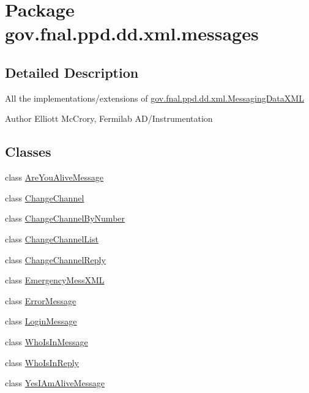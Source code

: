 \hypertarget{namespacegov_1_1fnal_1_1ppd_1_1dd_1_1xml_1_1messages}{\section{Package gov.\-fnal.\-ppd.\-dd.\-xml.\-messages}
\label{namespacegov_1_1fnal_1_1ppd_1_1dd_1_1xml_1_1messages}
}


\subsection{Detailed Description}
All the implementations/extensions of \hyperlink{classgov_1_1fnal_1_1ppd_1_1dd_1_1xml_1_1MessagingDataXML}{gov.\-fnal.\-ppd.\-dd.\-xml.\-Messaging\-Data\-X\-M\-L}

\begin{DoxyAuthor}{Author}
Elliott Mc\-Crory, Fermilab A\-D/\-Instrumentation 
\end{DoxyAuthor}
\subsection*{Classes}
\begin{DoxyCompactItemize}
\item 
class \hyperlink{classgov_1_1fnal_1_1ppd_1_1dd_1_1xml_1_1messages_1_1AreYouAliveMessage}{Are\-You\-Alive\-Message}
\item 
class \hyperlink{classgov_1_1fnal_1_1ppd_1_1dd_1_1xml_1_1messages_1_1ChangeChannel}{Change\-Channel}
\item 
class \hyperlink{classgov_1_1fnal_1_1ppd_1_1dd_1_1xml_1_1messages_1_1ChangeChannelByNumber}{Change\-Channel\-By\-Number}
\item 
class \hyperlink{classgov_1_1fnal_1_1ppd_1_1dd_1_1xml_1_1messages_1_1ChangeChannelList}{Change\-Channel\-List}
\item 
class \hyperlink{classgov_1_1fnal_1_1ppd_1_1dd_1_1xml_1_1messages_1_1ChangeChannelReply}{Change\-Channel\-Reply}
\item 
class \hyperlink{classgov_1_1fnal_1_1ppd_1_1dd_1_1xml_1_1messages_1_1EmergencyMessXML}{Emergency\-Mess\-X\-M\-L}
\item 
class \hyperlink{classgov_1_1fnal_1_1ppd_1_1dd_1_1xml_1_1messages_1_1ErrorMessage}{Error\-Message}
\item 
class \hyperlink{classgov_1_1fnal_1_1ppd_1_1dd_1_1xml_1_1messages_1_1LoginMessage}{Login\-Message}
\item 
class \hyperlink{classgov_1_1fnal_1_1ppd_1_1dd_1_1xml_1_1messages_1_1WhoIsInMessage}{Who\-Is\-In\-Message}
\item 
class \hyperlink{classgov_1_1fnal_1_1ppd_1_1dd_1_1xml_1_1messages_1_1WhoIsInReply}{Who\-Is\-In\-Reply}
\item 
class \hyperlink{classgov_1_1fnal_1_1ppd_1_1dd_1_1xml_1_1messages_1_1YesIAmAliveMessage}{Yes\-I\-Am\-Alive\-Message}
\end{DoxyCompactItemize}
